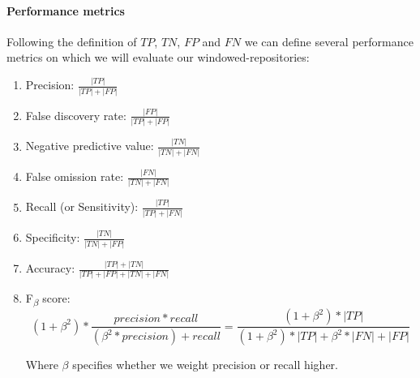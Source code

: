 \documentclass[12pt,twoside,notitlepage]{report}
\begin{document}
\paragraph{Performance metrics}Following the definition of $TP$, $TN$, $FP$ and $FN$ we can define several performance metrics on which we will evaluate our windowed-repositories\cite{IR}:
\begin{enumerate}[label=(\alph*)]
\item Precision: $\frac{|TP|}{|TP| + |FP|}$
\item False discovery rate: $\frac{|FP|}{|TP| + |FP|}$
\item Negative predictive value: $\frac{|TN|}{|TN| + |FN|}$
\item False omission rate: $\frac{|FN|}{|TN| + |FN|}$
\item Recall (or Sensitivity): $\frac{|TP|}{|TP| + |FN|}$ 
\item Specificity: $\frac{|TN|}{|TN| + |FP|}$
\item Accuracy: $\frac{|TP| + |TN|}{|TP| + |FP| + |TN| + |FN|}$
\item F\textsubscript{$\beta$} score: \[(1+\beta^2)*\frac{precision*recall}{(\beta^2*precision)+recall} = \frac{(1+\beta^2)*|TP|}{(1+\beta^2)*|TP| + \beta^2*|FN| + |FP|}\]

Where $\beta$ specifies whether we weight precision or recall higher.
\end{enumerate}
\end{document}
